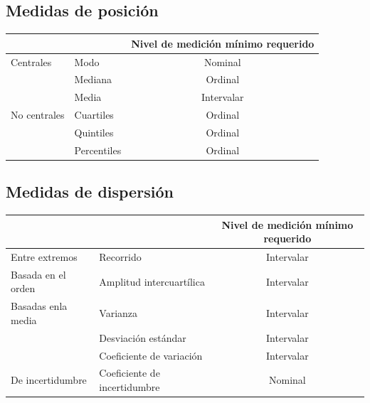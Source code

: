\documentclass[]{book}
\begin{document}
\hypertarget{medidas-de-posicion-1}{%
\subsection{Medidas de posición}\label{medidas-de-posicion-1}}

\begin{longtable}[]{@{}llc@{}}
\toprule
& & Nivel de medición mínimo requerido\tabularnewline
\midrule
\endhead
Centrales & Modo & Nominal\tabularnewline
& Mediana & Ordinal\tabularnewline
& Media & Intervalar\tabularnewline
No centrales & Cuartiles & Ordinal\tabularnewline
& Quintiles & Ordinal\tabularnewline
& Percentiles & Ordinal\tabularnewline
\bottomrule
\end{longtable}

\hypertarget{medidas-de-dispersion-1}{%
\subsection{Medidas de dispersión}\label{medidas-de-dispersion-1}}

\begin{longtable}[]{@{}llc@{}}
\toprule
& & Nivel de medición mínimo requerido\tabularnewline
\midrule
\endhead
Entre extremos & Recorrido & Intervalar\tabularnewline
Basada en el orden & Amplitud intercuartílica & Intervalar\tabularnewline
Basadas enla media & Varianza & Intervalar\tabularnewline
& Desviación estándar & Intervalar\tabularnewline
& Coeficiente de variación & Intervalar\tabularnewline
De incertidumbre & Coeficiente de incertidumbre & Nominal\tabularnewline
\bottomrule
\end{longtable}


\end{document}
